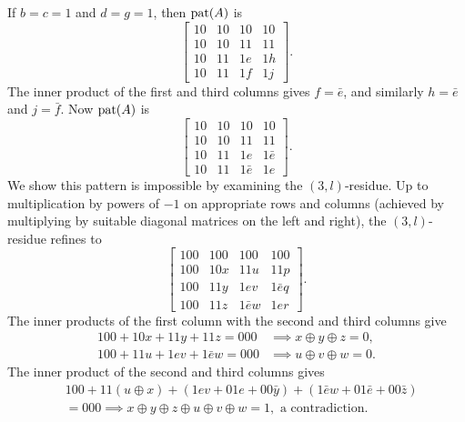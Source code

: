 \documentclass[reprint,amsmath,amssymb,aps,pra]{revtex4-2}
\begin{document}
If $b=c=1$ and $d=g=1$, then $\operatorname{pat}(A)$ is
\[
  \begin{bmatrix}
    10 & 10 & 10 & 10 \\
    10 & 10 & 11 & 11 \\
    10 & 11 & 1e & 1h \\
    10 & 11 & 1f & 1j
  \end{bmatrix}.
\]
The inner product of the first and third columns gives $f = \bar{e}$,
and similarly $h=\bar{e}$ and $j=\bar{f}$. Now $\operatorname{pat}(A)$ is
\[
  \begin{bmatrix}
    10 & 10 & 10       & 10       \\
    10 & 10 & 11       & 11       \\
    10 & 11 & 1e       & 1\bar{e} \\
    10 & 11 & 1\bar{e} & 1e
  \end{bmatrix}.
\]
We show this pattern is impossible by examining the
$(3,l)$-residue. Up to multiplication by powers of $-1$ on appropriate
rows and columns (achieved by multiplying by suitable diagonal
matrices on the left and right), the $(3,l)$-residue refines to
\[
  \begin{bmatrix}
    100 & 100 & 100       & 100       \\
    100 & 10x & 11u       & 11p       \\
    100 & 11y & 1ev       & 1\bar{e}q \\
    100 & 11z & 1\bar{e}w & 1er
  \end{bmatrix}.
\]
The inner products of the first column with the second and third
columns give
\begin{align*}
  100 + 10x + 11y + 11z = 000       & \implies x\oplus y \oplus z = 0, \\
  100 + 11u + 1ev + 1\bar{e}w = 000 & \implies u\oplus v \oplus w = 0.
\end{align*}
The inner product of the second and third columns gives
\begin{align*}
  & 100 + 11(u\oplus x) + (1ev + 01e + 00\bar{y}) + (1\bar{e}w + 01\bar{e} + 00\bar{z}) \\
  & = 000 \implies x\oplus y \oplus z \oplus u\oplus v \oplus w = 1, \text{ a contradiction.}
\end{align*}
\end{document}
